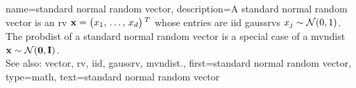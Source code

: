 {name={standard normal random vector}, 
	description={A standard normal random \gls{vector} 
		is an \gls{rv} ${\bf x}=\big(x_{1}, \,\ldots, \,x_{d}\big)\,^{T}$ 
		whose entries are \gls{iid} \glspl{gaussrv} $x_{j} \sim \mathcal{N}(0,1)$. 
		The \gls{probdist} of a standard normal random \gls{vector} is a special case 
		of a \gls{mvndist} ${\bf x} \sim \mathcal{N}(\mathbf{0},\mathbf{I})$.
		\\ 
		See also: \gls{vector}, \gls{rv}, \gls{iid}, \gls{gaussrv}, \gls{mvndist}.}, 
	first={standard normal random vector},
	type=math, 
	text={standard normal random vector}
}

